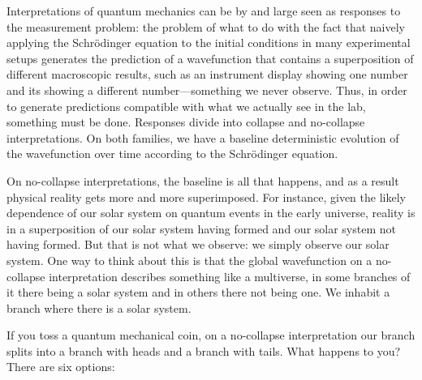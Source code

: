 Interpretations of quantum mechanics can be by and large seen as responses to the measurement problem: the problem of 
what to do with the fact that naively applying the Schr\"{o}dinger equation to the initial conditions in many experimental 
setups generates the prediction of a wavefunction that contains a superposition of different macroscopic results, such as 
an instrument display showing one number and its showing a different number---something we never observe. Thus, in order 
to generate predictions compatible with what we actually see in the lab, something must be done. Responses 
divide into collapse and no-collapse interpretations. On both families,
we have a baseline deterministic evolution of the wavefunction over time according to the Schr\"{o}dinger equation.

On no-collapse interpretations, the baseline is all that happens, and as a result physical reality gets more and more 
superimposed. For instance, given the likely dependence of our solar system on quantum events in the early universe,
reality is in a superposition of our solar system having formed and our solar system not having formed. But that is 
not what we observe: we simply observe our solar system. One way to think about this is that the global wavefunction 
on a no-collapse interpretation describes something like a multiverse, in some branches of it there being a solar system and 
in others there not being one. We inhabit a branch where there is a solar system. 

If you toss a quantum mechanical coin, on a no-collapse interpretation our branch splits into a branch with heads and a branch with tails. What happens
to you? There are six options:

